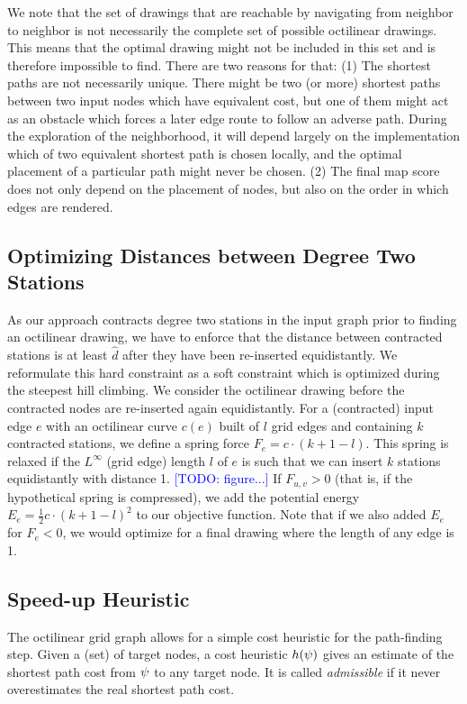 \documentclass[sigconf]{acmart}
\newcommand\TODO[1]{\textcolor{blue}{\small [TODO: #1]}}
\begin{document}
We note that the set of drawings that are reachable by navigating from neighbor to neighbor is not necessarily the complete set of possible octilinear drawings.
This means that the optimal drawing might not be included in this set and is therefore impossible to find.
There are two reasons for that: 
(1) The shortest paths are not necessarily unique.
There might be two (or more) shortest paths between two input nodes which have equivalent cost, but one of them might act as an obstacle which forces a later edge route to follow an adverse path.
During the exploration of the neighborhood, it will depend largely on the implementation which of two equivalent shortest path is chosen locally, and the optimal placement of a particular path might never be chosen.
(2) The final map score does not only depend on the placement of nodes, but also on the order in which edges are rendered.

\subsection{Optimizing Distances between Degree Two Stations}

As our approach contracts degree two stations in the input graph prior to finding an octilinear drawing, we have to enforce that the distance between contracted stations is at least $\hat d$ after they have been re-inserted equidistantly. 
We reformulate this hard constraint as a soft constraint which is optimized during the steepest hill climbing.
We consider the octilinear drawing before the contracted nodes are re-inserted again equidistantly.
For a (contracted) input edge $e$ with an octilinear curve $c(e)$ built of $l$ grid edges and containing $k$ contracted stations, we define a spring force $F_e = c \cdot (k + 1 - l)$.
This spring is relaxed if the $L^\infty$ (grid edge) length $l$ of $e$ is such that we can insert $k$ stations equidistantly with distance 1. \TODO{figure...}
If $F_{u, v} > 0$ (that is, if the hypothetical spring is compressed), we add the potential energy $E_e = \frac{1}{2} c \cdot (k + 1 - l)^2$ to our objective function.
Note that if we also added $E_e$ for $F_e < 0$, we would optimize for a final drawing where the length of any edge is 1.

\subsection{Speed-up Heuristic}

The octilinear grid graph allows for a simple cost heuristic for the path-finding step.
Given a (set) of target nodes, a cost heuristic $h(\psi)$ gives an estimate of the shortest path cost from $\psi$ to any target node.
It is called \emph{admissible} if it never overestimates the real shortest path cost.
\end{document}
